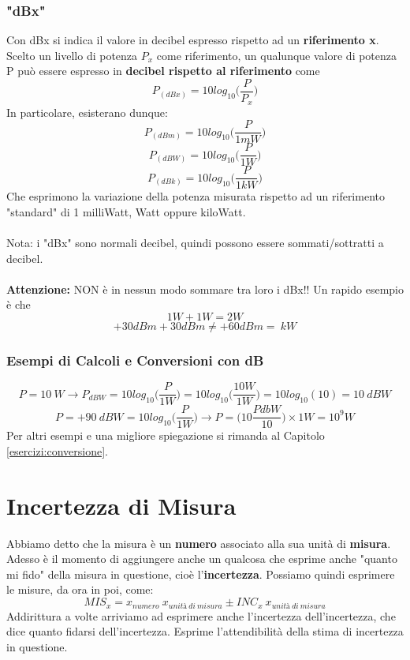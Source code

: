 \documentclass[a4paper,11pt]{report}
\begin{document}
\subsection*{"dBx"}
Con dBx si indica il valore in decibel espresso rispetto ad un \textbf{riferimento x}. Scelto un livello di potenza $P_{x}$ come riferimento, un qualunque valore di potenza P può essere espresso in \textbf{decibel rispetto al riferimento} come
$$
  P_{(dBx)} = 10log_{10}\Bigg( \frac{P}{P_{x}} \Bigg)
$$
In particolare, esisterano dunque:
$$P_{(dBm)} = 10log_{10}\Bigg( \frac{P}{1mW} \Bigg)$$
$$P_{(dBW)} = 10log_{10}\Bigg( \frac{P}{1W} \Bigg)$$
$$P_{(dBk)} = 10log_{10}\Bigg( \frac{P}{1kW} \Bigg)$$
Che esprimono la variazione della potenza misurata rispetto ad un riferimento "standard" di 1 milliWatt, Watt oppure kiloWatt.\\ \\
Nota: i "dBx" sono normali decibel, quindi possono essere sommati/sottratti a decibel.\\ \\
{\Large {\textbf{Attenzione:}}} NON è in nessun modo sommare tra loro i dBx!! Un rapido esempio è che
$$1 W + 1 W = 2 W$$
$$+30 dBm + 30 dBm \neq + 60 dBm = \ kW$$
\subsection{Esempi di Calcoli e Conversioni con dB}
$$P = 10\ W \rightarrow P_{dBW} = 10 log_{10}\Bigg(\frac{P}{1W}\Bigg) = 10 log_{10}\Bigg(\frac{10 W}{1 W}\Bigg) = 10 log_{10}(10) = 10\ dBW$$
$$P = +90\ dBW = 10 log_{10}\Bigg(\frac{P}{1W}\Bigg) \rightarrow P = \Bigg( 10 \frac{PdbW}{10}\Bigg)\times 1 W = 10^9 W $$
Per altri esempi e una migliore spiegazione si rimanda al Capitolo \ref{esercizi:conversione}.
\newpage
\chapter{Incertezza di Misura}
Abbiamo detto che la misura è un \textbf{numero} associato alla sua unità di \textbf{misura}. Adesso è il momento di aggiungere anche un qualcosa che esprime anche "quanto mi fido" della misura in questione, cioè l'\textbf{incertezza}. Possiamo quindi esprimere le misure, da ora in poi, come: $$ MIS_{x} = x_{numero}\ x_{unità\ di\ misura} \pm INC_{x}\ x_{unità\ di\ misura} $$
Addirittura a volte arriviamo ad esprimere anche l'incertezza dell'incertezza, che dice quanto fidarsi dell'incertezza. Esprime l'attendibilità della stima di incertezza in questione.
\end{document}
